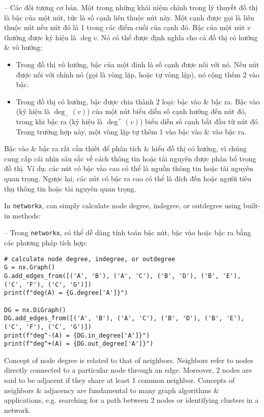 \documentclass{article}
\begin{document}
\begin{itemize}
\begin{itemize}
\begin{itemize}
            -- {\sf Các đối tượng cơ bản.} Một trong những khái niệm chính trong lý thuyết đồ thị là bậc của một nút, tức là số cạnh liên thuộc nút này. Một cạnh được gọi là liên thuộc nút nếu nút đó là 1 trong các điểm cuối của cạnh đó. Bậc của một nút $v$ thường được ký hiệu là $\deg v$. Nó có thể được định nghĩa cho cả đồ thị có hướng \& vô hướng:
            \begin{itemize}
                \item Trong đồ thị vô hướng, bậc của một đỉnh là số cạnh được nối với nó. Nếu nút được nối với chính nó (gọi là vòng lặp, hoặc tự vòng lặp), nó cộng thêm 2 vào bậc.
                \item Trong đồ thị có hướng, bậc được chia thành 2 loại: bậc vào \& bậc ra. Bậc vào (ký hiệu là $\deg_-(v)$) của một nút biểu diễn số cạnh hướng đến nút đó, trong khi bậc ra (ký hiệu là $\deg^+(v)$) biểu diễn số cạnh bắt đầu từ nút đó. Trong trường hợp này, một vòng lặp tự thêm 1 vào bậc vào \& vào bậc ra.
            \end{itemize}
            Bậc vào \& bậc ra rất cần thiết để phân tích \& hiểu đồ thị có hướng, vì chúng cung cấp cái nhìn sâu sắc về cách thông tin hoặc tài nguyên được phân bổ trong đồ thị. Ví dụ: các nút có bậc vào cao có thể là nguồn thông tin hoặc tài nguyên quan trọng. Ngược lại, các nút có bậc ra cao có thể là đích đến hoặc người tiêu thụ thông tin hoặc tài nguyên quan trọng.

            In {\tt networkx}, can simply calculate node degree, indegree, or outdegree using built-in methods:

            -- Trong {\tt networkx}, có thể dễ dàng tính toán bậc nút, bậc vào hoặc bậc ra bằng các phương pháp tích hợp:
            \begin{verbatim}
# calculate node degree, indegree, or outdegree
G = nx.Graph()
G.add_edges_from([('A', 'B'), ('A', 'C'), ('B', 'D'), ('B', 'E'), ('C', 'F'), ('C', 'G')])
print(f"deg(A) = {G.degree['A']}")

DG = nx.DiGraph()
DG.add_edges_from([('A', 'B'), ('A', 'C'), ('B', 'D'), ('B', 'E'), ('C', 'F'), ('C', 'G')])
print(f"deg^-(A) = {DG.in_degree['A']}")
print(f"deg^+(A) = {DG.out_degree['A']}")
            \end{verbatim}
            Concept of node degree is related to that of neighbors. Neighbors refer to nodes directly connected to a particular node through an edge. Moreover, 2 nodes are said to be adjacent if they share at least 1 common neighbor. Concepts of neighbors \& adjacency are fundamental to many graph algorithms \& applications, e.g. searching for a path between 2 nodes or identifying clusters in a network.


\end{itemize}
\end{itemize}
\end{itemize}
\end{document}
